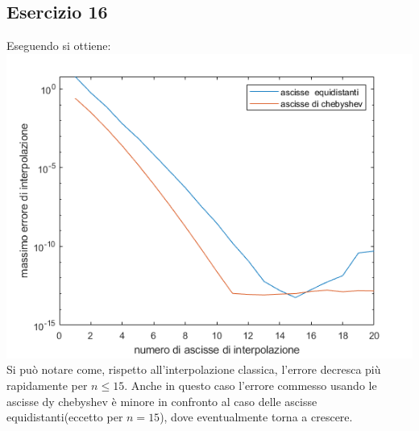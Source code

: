 \subsection{Esercizio 16}
Eseguendo  si ottiene:\\
\includegraphics[scale=0.8]{capitolo4/hermite.png}
Si può notare come, rispetto all'interpolazione classica, l'errore decresca più rapidamente per $n \le 15$. Anche in questo caso l'errore commesso usando le ascisse dy chebyshev
è minore in confronto al caso delle ascisse equidistanti(eccetto per $n=15$), dove eventualmente torna a crescere.